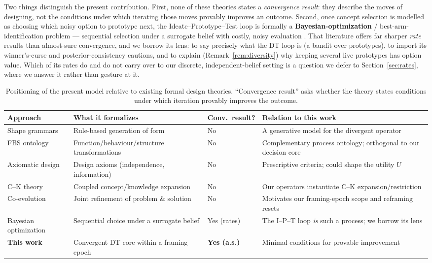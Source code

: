 \documentclass[11pt]{article}
\begin{document}
Two things distinguish the present contribution. First, none of these theories states a \emph{convergence result}: they describe the moves of designing, not the conditions under which iterating those moves provably improves an outcome. Second, once concept selection is modelled as choosing which noisy option to prototype next, the Ideate--Prototype--Test loop is formally a \textbf{Bayesian-optimization} / best-arm-identification problem --- sequential selection under a surrogate belief with costly, noisy evaluation \citep{shahriari2016, bubeck2012}. That literature offers far sharper \emph{rate} results than almost-sure convergence, and we borrow its lens: to say precisely what the DT loop is (a bandit over prototypes), to import its winner's-curse and posterior-consistency cautions, and to explain (Remark~\ref{rem:diversity}) why keeping several live prototypes has option value. Which of its rates do and do not carry over to our discrete, independent-belief setting is a question we defer to Section~\ref{sec:rates}, where we answer it rather than gesture at it.

\begin{table}[h!]
\centering
\caption{Positioning of the present model relative to existing formal design theories. ``Convergence result'' asks whether the theory states conditions under which iteration provably improves the outcome.}
\label{tab:related}
\footnotesize
\setlength{\tabcolsep}{5pt}
\begin{tabularx}{\textwidth}{@{}>{\raggedright\arraybackslash}p{} >{\raggedright\arraybackslash}X >{\centering\arraybackslash}p{} >{\raggedright\arraybackslash}X@{}}
\toprule
\textbf{Approach} & \textbf{What it formalizes} & \textbf{Conv.\ result?} & \textbf{Relation to this work} \\
\midrule
Shape grammars \citep{stiny1972} & Rule-based generation of form & No & A generative model for the divergent operator \\
FBS ontology \citep{gero2004} & Function/behaviour/structure transformations & No & Complementary process ontology; orthogonal to our decision core \\
Axiomatic design \citep{suh1990} & Design axioms (independence, information) & No & Prescriptive criteria; could shape the utility $U$ \\
C--K theory \citep{hatchuel2009} & Coupled concept/knowledge expansion & No & Our operators instantiate C--K expansion/restriction \\
Co-evolution \citep{dorstcross2001} & Joint refinement of problem \& solution & No & Motivates our framing-epoch scope and reframing resets \\
Bayesian optimization \citep{shahriari2016} & Sequential choice under a surrogate belief & Yes (rates) & The I--P--T loop \emph{is} such a process; we borrow its lens \\
\textbf{This work} & Convergent DT core within a framing epoch & \textbf{Yes (a.s.)} & Minimal conditions for provable improvement \\
\bottomrule
\end{tabularx}
\end{table}
\end{document}
